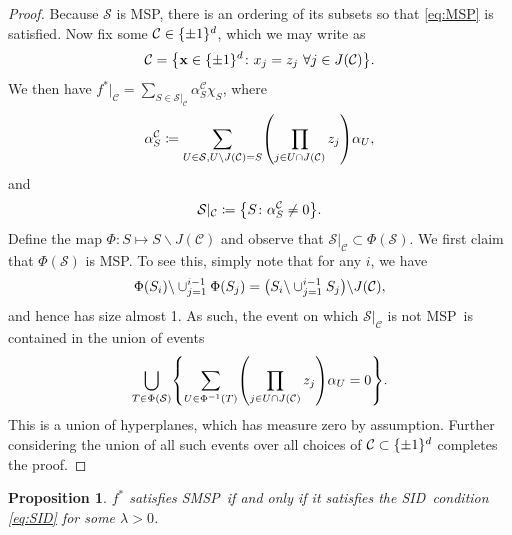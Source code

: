 \documentclass[11pt]{article}
\newtheorem{proposition}[theorem]{Proposition}
\newcommand{\bx}{\mathbf{x}}
\DeclarePairedDelimiter{\braces}{\lbrace}{\rbrace}
\DeclarePairedDelimiter{\paren}{(}{)}
\newcommand{\cell}{\mathcal{C}}
\newcommand{\binspace}{\braces{\pm 1}^\nfeats}
\newcommand{\nfeats}{d}
\newcommand{\cellfeatindices}{J}
\newcommand{\MSP}{\textsf{MSP}}
\newcommand{\SID}{\textsf{SID}}
\newcommand{\monomial}{\chi}
\newcommand{\fcoefs}{\mathcal{S}}
\newcommand{\stabmsp}{\textsf{SMSP}}
\begin{document}
\begin{proof}
    Because $\fcoefs$ is \MSP, there is an ordering of its subsets so that \eqref{eq:MSP} is satisfied.
    Now fix some $\cell \in \binspace$, which we may write as
    \begin{equation}
        \cell = \braces*{\bx \in \binspace \colon x_j = z_j ~\forall j \in \cellfeatindices(\cell)}.
    \end{equation}
    We then have $f^*|_\cell = \sum_{S \in \fcoefs|_\cell} \alpha_S^\cell \monomial_S$, where
    \begin{equation}
        \alpha_S^\cell \coloneqq \sum_{U \in \fcoefs, U\backslash \cellfeatindices(\cell) = S} \paren*{\prod_{j \in U\cap \cellfeatindices(\cell)} z_j} \alpha_U,
    \end{equation}
    and
    \begin{equation}
        \fcoefs|_\cell \coloneqq \braces*{S \colon \alpha_S^\cell \neq 0}.
    \end{equation}
    Define the map $\Phi \colon S \mapsto S\backslash \cellfeatindices(\cell)$ and observe that $\fcoefs|_\cell \subset \Phi(\fcoefs)$.
    We first claim that $\Phi(\fcoefs)$ is \MSP.
    To see this, simply note that for any $i$, we have
    \begin{equation}
        \Phi(S_i)\backslash \cup_{j=1}^{i-1}\Phi(S_j) = \paren*{S_i\backslash\cup_{j=1}^{i-1}S_j}\backslash \cellfeatindices(\cell),
    \end{equation}
    and hence has size almost 1.
    As such, the event on which $\fcoefs|_\cell$ is not \MSP~is contained in the union of events
    \begin{equation}
        \bigcup_{T \in \Phi(\fcoefs)}\braces*{\sum_{U \in \Phi^{-1}(T)} \paren*{\prod_{j \in U\cap \cellfeatindices(\cell)} z_j} \alpha_U = 0}.
    \end{equation}
    This is a union of hyperplanes, which has measure zero by assumption.
    Further considering the union of all such events over all choices of $\cell \subset \binspace$ completes the proof.
\end{proof}

\begin{proposition}
\label{prop:stable_msp_and_SID}
    $f^*$ satisfies \stabmsp~if and only if it satisfies the \SID~condition \eqref{eq:SID} for some $\lambda > 0$.
\end{proposition}
\end{document}
